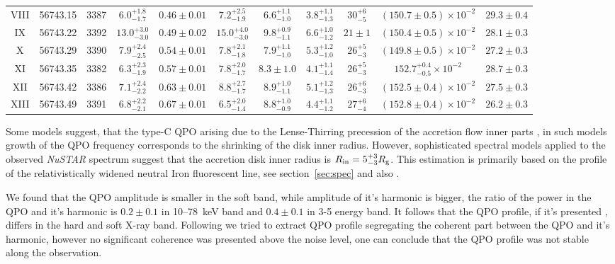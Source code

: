 \documentclass[a4paper,fleqn,usenatbib]{mnras}
\begin{document}
\begin{table}
\begin{tabular}{|c|c|c|c|c|c|c|c|c|c|c|}
VIII & 56743.15 & 3387 & $6.0_{-1.7}^{+1.8}$ & $0.46\pm0.01$ & $7.2_{-1.9}^{+2.5}$ & $6.6_{-1.0}^{+1.1}$ & $3.8_{-1.3}^{+1.1}$ & $30_{-5}^{+6}$ & $(150.7\pm0.5)\times10^{-2}$ & $29.3\pm0.4$ \\
IX & 56743.22 & 3392 & $13.0_{-3.0}^{+3.0}$ & $0.49\pm0.02$ & $15.0_{-3.0}^{+4.0}$ & $9.8_{-1.1}^{+0.9}$ & $6.6_{-1.2}^{+1.0}$ & $21\pm1$ & $(150.4\pm0.5)\times10^{-2}$ & $28.1\pm0.3$ \\
X & 56743.29  & 3390 & $7.9_{-2.5}^{+2.4}$ & $0.54\pm0.01$ & $7.8_{-1.8}^{+2.1}$ & $7.9_{-1.0}^{+1.1}$ & $5.3_{-1.0}^{+1.2}$ & $26_{-3}^{+5}$ & $(149.8\pm0.5)\times10^{-2}$ & $27.2\pm0.3$ \\
XI & 56743.35 & 3382 & $6.3_{-1.9}^{+2.3}$ & $0.57\pm0.01$ & $7.8_{-1.7}^{+2.0}$ & $8.3\pm1.0$ & $4.1_{-1.4}^{+1.1}$ & $26_{-3}^{+5}$ & $152.7_{-0.5}^{+0.4}\times10^{-2}$ & $28.7\pm0.3$ \\
XII & 56743.42 & 3386 & $7.1_{-2.2}^{+2.4}$ & $0.63\pm0.01$ & $8.8_{-1.7}^{+2.7}$ & $8.9_{-1.1}^{+1.0}$ & $5.1_{-1.3}^{+1.2}$ & $26_{-3}^{+6}$ & $(152.5\pm0.4)\times10^{-2}$ & $27.5\pm0.3$ \\
XIII &  56743.49 & 3391 & $6.8_{-2.1}^{+2.2}$ & $0.67\pm0.01$ & $6.5_{-1.4}^{+2.0}$ & $8.8_{-0.9}^{+1.0}$ & $4.4_{-1.2}^{+1.1}$ & $27_{-4}^{+6}$ & $(152.8\pm0.4)\times10^{-2}$ & $26.2\pm0.3$ \\
\hline
\end{tabular}
\end{table}

Some models suggest, that the type-C QPO arising due to the Lense-Thirring precession of the accretion flow inner parts \citep{1998ApJ...492L..59S, 2006ApJ...642..420S, 2009MNRAS.397L.101I}, in such models growth of the QPO frequency corresponds to the shrinking of the disk inner radius.
However, sophisticated spectral models applied to the observed {\it NuSTAR} spectrum suggest that the accretion disk inner radius is $R_{\rm in}= 5_{-3}^{+3}R_{\rm g}$.
This estimation is primarily based on the profile of the relativistically widened neutral Iron fluorescent line, see section~\ref{sec:spec} and also \citep{miller15_nust}.

We found that the QPO amplitude is smaller in the soft band, while amplitude of it's harmonic is bigger, the ratio of the power in the QPO and it's harmonic is $0.2\pm0.1$ in 10--78~keV band and $0.4\pm0.1$ in 3-5 energy band.
It follows that the QPO profile, if it's presented \citep[see, e.g.][]{2015MNRAS.446.3516I}, differs in the hard and soft X-ray band.
Following \citep{2015MNRAS.446.3516I} we tried to extract  QPO profile segregating the coherent part between the QPO and it's harmonic, however no significant coherence was presented above the noise level, one can conclude that the QPO profile was not stable along the observation. 
\end{document}
